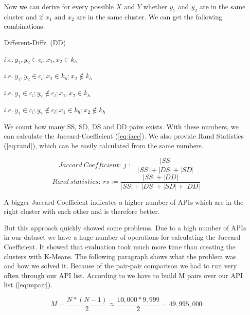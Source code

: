 \documentclass[a4paper]{IEEEtran}
\begin{document}
Now we can derive for every possible $X$ and $Y$ whether $y_1$  and $y_2$ are in the same cluster and if $x_1$  and $x_2$ are in the same cluster. We can get the following combinations: \\
\begin{labeling}{Different-Diffr. (DD)}
\item [Same-Same (SS)]  $i.e.~y_1,y_2 \in c_l; x_1,x_2 \in k_h$ \\
\item [Same-Different (SD)]  $i.e.~ y_1,y_2 \in c_l; x_1 \in k_h; x_2 \notin k_h$ \\
\item [Different-Same (DS)]  $i.e.~ y_1 \in c_l; y_2 \notin c_l; x_1,x_2 \in k_h$ \\
\item [Different-Diffr. (DD)]  $i.e.~y_1 \in c_l; y_2 \notin c_l; x_1 \in k_h;x_2 \notin k_h$\\
\end{labeling}

We count how many SS, SD, DS and DD pairs exists. With these numbers, we can calculate the Jaccard-Coefficient (\ref{eq:jacc}). We also provide Rand Statistics (\ref{eq:rand}), which can be easily calculated from the same numbers.

\begin{equation}
\label{eq:jacc}
Jaccard~Coefficient:~ j:= \frac{|SS|}{|SS|+|DS|+|SD|}
\end{equation}
\begin{equation}
\label{eq:rand}
Rand~statistics:~ rs:= \frac{|SS|+|DD|}{|SS|+|DS|+|SD|+|DD|}
\end{equation}
\vspace{5mm}

A bigger Jaccard-Coefficient indicates a higher number of APIs which are in the right cluster with each other and is therefore better.

But this approach quickly showed some problems. Due to a high number of APIs in our dataset we have a huge number of operations for calculating the Jaccard-Coefficient. It showed that evaluation took much more time than creating the clusters with K-Means. The following paragraph shows what the problem was and how we solved it.
Because of the pair-pair comparison we had to run very often through our API list. According to \cite{halkidi2002cluster} we have to build M pairs over our API list (\ref{eq:mpair}).

\begin{equation}
\label{eq:mpair}
M= \frac{N*(N-1)}{2}\approx \frac{10,000*9,999}{2}=49,995,000
\end{equation}
\end{document}
